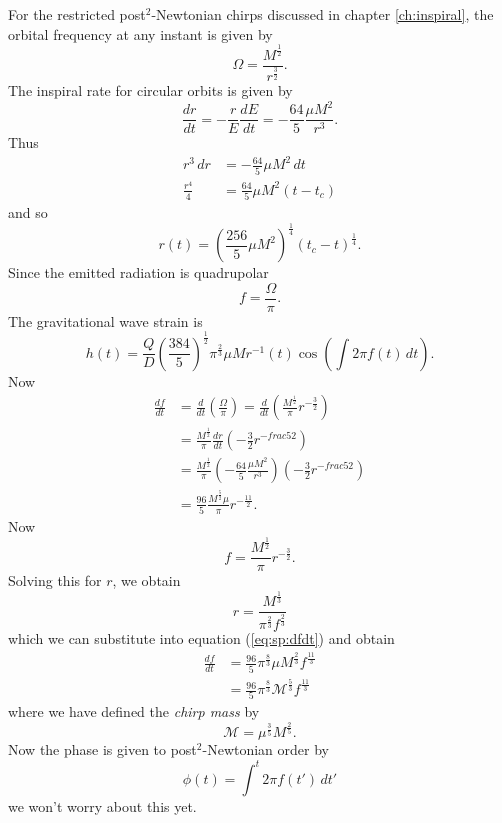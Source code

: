For the restricted post$^2$-Newtonian chirps discussed in chapter
\ref{ch:inspiral}, the orbital frequency at any instant is given by
\begin{equation}
\Omega = \frac{M^{\frac{1}{2}}}{r^{\frac{3}{2}}}.
\end{equation}
The inspiral rate for circular orbits is given by
\begin{equation}
\frac{dr}{dt} = - \frac{r}{E} \frac{dE}{dt} = 
- \frac{64}{5} \frac{\mu M^2}{r^3}.
\end{equation}
Thus
\begin{align}
r^3 \, dr &= - \frac{64}{5} \mu M^2 \, dt \\
\frac{r^4}{4} &= \frac{64}{5} \mu M^2 (t - t_c)
\end{align}
and so
\begin{equation}
r(t) = \left(\frac{256}{5} \mu M^2 \right)^{\frac{1}{4}}
       \left(t_c - t\right)^{\frac{1}{4}}.
\end{equation}
Since the emitted radiation is quadrupolar
\begin{equation}
f = \frac{\Omega}{\pi}.
\end{equation}
The gravitational wave strain is
\begin{equation}
h(t) = \frac{Q}{D} \left(\frac{384}{5}\right)^\frac{1}{2} \pi^\frac{2}{3} \mu M
r^{-1}(t) \cos \left( \int 2\pi f(t) \, dt \right).
\end{equation}
Now
\begin{align}
\frac{df}{dt} 
     &= \frac{d}{dt} \left(\frac{\Omega}{\pi}\right) 
      = \frac{d}{dt} \left(\frac{M^\frac{1}{2}}{\pi} r^{-\frac{3}{2}}\right) \\
     &= \frac{M^\frac{1}{2}}{\pi} \frac{dr}{dt} \left(-\frac{3}{2} r^{-frac{5}{2}}\right) \\
     &= \frac{M^\frac{1}{2}}{\pi} \left(-\frac{64}{5} \frac{\mu M^2}{r^3}\right)
        \left(-\frac{3}{2} r^{-frac{5}{2}}\right) \\
     &= \frac{96}{5} \frac{M^\frac{5}{2} \mu}{\pi} r^{-\frac{11}{2}}. 
     \label{eq:sp:dfdt}
\end{align}
Now
\begin{equation}
f = \frac{M^\frac{1}{2}}{\pi} r^{-\frac{3}{2}}.
\end{equation}
Solving this for $r$, we obtain
\begin{equation}
r = \frac{M^\frac{1}{3}}{\pi^\frac{2}{3} f^\frac{2}{3}}
\end{equation}
which we can substitute into equation (\ref{eq:sp:dfdt}) and obtain
\begin{align}
\frac{df}{dt} &= \frac{96}{5} \pi^\frac{8}{3} \mu M^\frac{2}{3} f^\frac{11}{3} \\
&= \frac{96}{5} \pi^\frac{8}{3} \mathcal{M}^\frac{5}{3} f^\frac{11}{3}
\end{align}
where we have defined the \emph{chirp mass} by
\begin{equation}
\mathcal{M} = \mu^\frac{3}{5} M^\frac{2}{5}.
\end{equation}
Now the phase is given to post$^2$-Newtonian order by\cite{Blanchet:1996pi}
\begin{equation}
\phi(t) = \int^t 2\pi f(t') \, dt'
\end{equation}
we won't worry about this yet.

